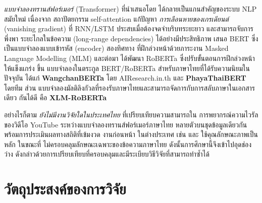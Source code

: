 \emph{แบบจำลองทรานส์ฟอร์เมอร์} (Transformer) ที่นำเสนอโดย \textcite{vaswani2017attention} ได้กลายเป็นแกนสำคัญของระบบ NLP สมัยใหม่ เนื่องจาก
สถาปัตยกรรม self-attention แก้ปัญหา \emph{การเลือนหายของเกรเดียนต์} (vanishing
gradient) ที่ RNN/LSTM ประสบเมื่อต้องจดจำบริบทระยะยาว และสามารถจับการพึ่งพา
ระยะไกลในข้อความ (long-range dependencies) ได้อย่างมีประสิทธิภาพ \textcite{devlin2019bert} เสนอ BERT ซึ่งเป็นแบบจำลองแบบเข้ารหัส (encoder) สองทิศทาง
ที่ฝึกล่วงหน้าด้วยภาระงาน Masked Language Modelling (MLM) และต่อมา \textcite{liu2019roberta} ได้พัฒนา RoBERTa ซึ่งปรับขั้นตอนการฝึกล่วงหน้าให้แข็งแกร่ง
ขึ้น แบบจำลองในตระกูล BERT/RoBERTa สำหรับภาษาไทยที่ได้รับความนิยมในปัจจุบัน
ได้แก่ \textbf{WangchanBERTa} โดย AIResearch.in.th \cite{lowphansirikul2021wangchanberta}
และ \textbf{PhayaThaiBERT} โดยทีม \textcite{phayathaibert2023} ส่วน
แบบจำลองมัลติลิงกัวลที่รองรับภาษาไทยและสามารถจัดการกับการสลับภาษาในเอกสารเดียว
กันได้ดี คือ \textbf{XLM-RoBERTa} \cite{conneau2020xlmr}

อย่างไรก็ตาม \emph{ยังไม่มีงานวิจัยใดในประเทศไทย} ที่เปรียบเทียบความสามารถใน
การพยากรณ์ความไวรัลของวิดีโอ YouTube ระหว่างแบบจำลองทรานส์ฟอร์เมอร์ภาษาไทย
หลายตัวบนชุดข้อมูลเดียวกัน พร้อมการประเมินผลทางสถิติที่เข้มงวด งานก่อนหน้า
ในต่างประเทศ เช่น \textcite{trzcinski2017popularity} และ
\textcite{khosla2014popularity} ใช้คุณลักษณะภาพเป็นหลัก ในขณะที่
ไม่ครอบคลุมลักษณะเฉพาะของข้อความภาษาไทย ดังนั้นการศึกษานี้จึงเข้าไปอุดช่องว่าง
ดังกล่าวด้วยการเปรียบเทียบที่ครอบคลุมและมีระเบียบวิธีวิจัยที่สามารถทำซ้ำได้

\section{วัตถุประสงค์ของการวิจัย}
\label{sec:intro-objectives}

